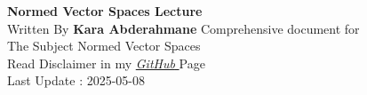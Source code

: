 \documentclass{report}
\begin{document}
\begin{titlepage}
   \begin{center}
       \vspace*{1cm}
       \textbf{Normed Vector Spaces Lecture} \\
       \vspace{0.5cm} 
       Written By \textbf{Kara Abderahmane}
       \vspace{1.5cm}
       \vfill
       Comprehensive document for \\
       The Subject Normed Vector Spaces \\
       Read Disclaimer in my 
       \href{https://github.com/Kapa9102/nvs-lecture}{\it GitHub \normalfont}  Page  \\
       \vspace{0.8cm}
       Last Update : 2025-05-08 
   \end{center}
\end{titlepage}

\tableofcontents






















\end{document}
